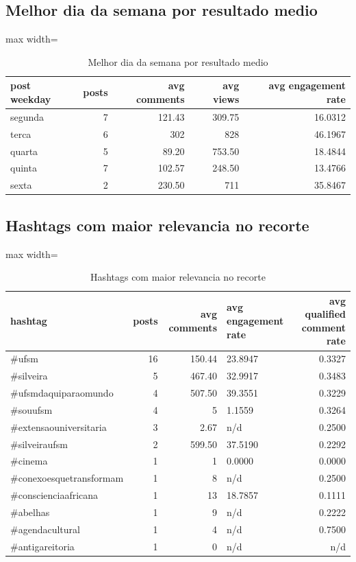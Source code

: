 \documentclass[12pt,a4paper]{article}
\begin{document}
\subsection{Melhor dia da semana por resultado medio}
\begin{table}[H]
\centering
\scriptsize
\begin{adjustbox}{max width=\textwidth}
\begin{tabular}{l r r r r}
\toprule
post weekday & posts & avg comments & avg views & avg engagement rate \\
\midrule
segunda & 7 & 121.43 & 309.75 & 16.0312 \\
terca & 6 & 302 & 828 & 46.1967 \\
quarta & 5 & 89.20 & 753.50 & 18.4844 \\
quinta & 7 & 102.57 & 248.50 & 13.4766 \\
sexta & 2 & 230.50 & 711 & 35.8467 \\
\bottomrule
\end{tabular}
\end{adjustbox}
\caption{Melhor dia da semana por resultado medio}
\label{tab:dia}
\end{table}

\subsection{Hashtags com maior relevancia no recorte}
\begin{table}[H]
\centering
\scriptsize
\begin{adjustbox}{max width=\textwidth}
\begin{tabular}{l r r l r}
\toprule
hashtag & posts & avg comments & avg engagement rate & avg qualified comment rate \\
\midrule
\#ufsm & 16 & 150.44 & 23.8947 & 0.3327 \\
\#silveira & 5 & 467.40 & 32.9917 & 0.3483 \\
\#ufsmdaquiparaomundo & 4 & 507.50 & 39.3551 & 0.3229 \\
\#souufsm & 4 & 5 & 1.1559 & 0.3264 \\
\#extensaouniversitaria & 3 & 2.67 & n/d & 0.2500 \\
\#silveiraufsm & 2 & 599.50 & 37.5190 & 0.2292 \\
\#cinema & 1 & 1 & 0.0000 & 0.0000 \\
\#conexoesquetransformam & 1 & 8 & n/d & 0.2500 \\
\#conscienciaafricana & 1 & 13 & 18.7857 & 0.1111 \\
\#abelhas & 1 & 9 & n/d & 0.2222 \\
\#agendacultural & 1 & 4 & n/d & 0.7500 \\
\#antigareitoria & 1 & 0 & n/d & n/d \\
\bottomrule
\end{tabular}
\end{adjustbox}
\caption{Hashtags com maior relevancia no recorte}
\label{tab:hashtags}
\end{table}
\end{document}
